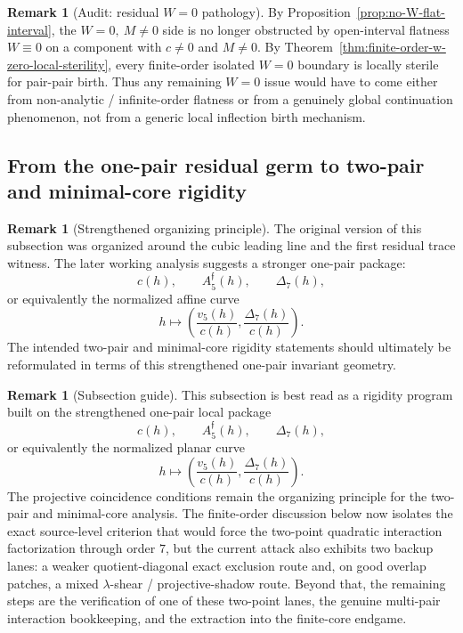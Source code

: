 \documentclass[11pt,a4paper]{amsart}
\theoremstyle{plain}
\theoremstyle{definition}
\newtheorem{remark}[theorem]{Remark}
\begin{document}
\begin{remark}[Audit: residual $W=0$ pathology]
\label{rem:audit-residual-w0-pathology}
By Proposition~\ref{prop:no-W-flat-interval}, the $W=0,\ M\neq 0$ side is no
longer obstructed by open-interval flatness $W\equiv 0$ on a component with
$c\neq 0$ and $M\neq 0$. By
Theorem~\ref{thm:finite-order-w-zero-local-sterility}, every finite-order
isolated $W=0$ boundary is locally sterile for pair-pair birth. Thus any
remaining $W=0$ issue would have to come either from non-analytic /
infinite-order flatness or from a genuinely global continuation phenomenon,
not from a generic local inflection birth mechanism.
\end{remark}

\subsection{From the one-pair residual germ to two-pair and minimal-core rigidity}

\begin{remark}[Strengthened organizing principle]
\label{rem:strengthened-organizing-principle}
The original version of this subsection was organized around the cubic leading
line and the first residual trace witness. The later working analysis suggests
a stronger one-pair package:
\[
c(h),\qquad A_5^{\mathfrak f}(h),\qquad \Delta_7(h),
\]
or equivalently the normalized affine curve
\[
h\longmapsto \left(\frac{v_5(h)}{c(h)},\frac{\Delta_7(h)}{c(h)}\right).
\]
The intended two-pair and minimal-core rigidity statements should ultimately be
reformulated in terms of this strengthened one-pair invariant geometry.
\end{remark}

\begin{remark}[Subsection guide]
\label{rem:wip-multi-pair-subsection}
This subsection is best read as a rigidity program built on the strengthened
one-pair local package
\[
c(h),\qquad A_5^{\mathfrak f}(h),\qquad \Delta_7(h),
\]
or equivalently the normalized planar curve
\[
h\longmapsto \left(\frac{v_5(h)}{c(h)},\frac{\Delta_7(h)}{c(h)}\right).
\]
The projective coincidence conditions remain the organizing principle for the
two-pair and minimal-core analysis. The finite-order discussion below now
isolates the exact source-level criterion that would force the two-point
quadratic interaction factorization through order $7$, but the current attack
also exhibits two backup lanes: a weaker quotient-diagonal exact exclusion route
and, on good overlap patches, a mixed $\lambda$-shear / projective-shadow
route. Beyond that, the remaining steps are the verification of one of these
two-point lanes, the genuine multi-pair interaction bookkeeping, and the
extraction into the finite-core endgame.
\end{remark}
\end{document}
